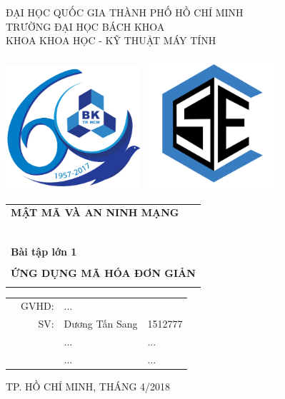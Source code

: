 \documentclass[a4paper]{article}
\begin{document}
\begin{titlepage}
\begin{center}
ĐẠI HỌC QUỐC GIA THÀNH PHỐ HỒ CHÍ MINH \\
TRƯỜNG ĐẠI HỌC BÁCH KHOA \\
KHOA KHOA HỌC - KỸ THUẬT MÁY TÍNH 
\end{center}

\vspace{1cm}

\includegraphics[width=5cm]{hcmut.png}
\hfill
\includegraphics[width=5cm]{cse.png}

\vspace{1cm}


\begin{center}
\begin{tabular}{c}
\multicolumn{1}{l}{\textbf{{\Large MẬT MÃ VÀ AN NINH MẠNG}}}\\
~~\\
\hline
\\
\multicolumn{1}{l}{\textbf{{\Large Bài tập lớn 1}}}\\
\\
\textbf{{\Huge ỨNG DỤNG MÃ HÓA ĐƠN GIẢN}}\\
\\
\hline
\end{tabular}
\end{center}

\vspace{3cm}

\begin{center}
\begin{table}[h]
\begin{tabular}{rrll}
\hspace{5 cm} & GVHD: & ...&\\
& SV: & Dương Tấn Sang &1512777\\
&&...&...\\
&&...&...
\end{tabular}
\end{table}
\end{center}

\begin{center}
{\footnotesize TP. HỒ CHÍ MINH, THÁNG 4/2018}
\end{center}
\end{titlepage}
\end{document}
